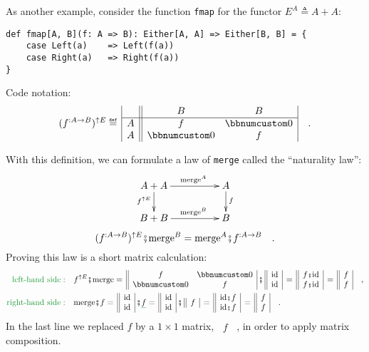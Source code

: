 As another example, consider the function \lstinline!fmap! for the
functor $E^{A}\triangleq A+A$:
\begin{lstlisting}
def fmap[A, B](f: A => B): Either[A, A] => Either[B, B] = {
    case Left(a)    => Left(f(a))
    case Right(a)   => Right(f(a))
}
\end{lstlisting}
Code notation:
\[
(f^{:A\rightarrow B})^{\uparrow E}\triangleq\,\begin{array}{|c||cc|}
 & B & B\\
\hline A & f & \bbnum 0\\
A & \bbnum 0 & f
\end{array}\quad.
\]

With this definition, we can formulate a law of \lstinline!merge!
called the \textsf{``}naturality law\textsf{''}:
\[
\xymatrix{\xyScaleY{1.6pc}\xyScaleX{4.0pc}A+A\ar[d]\sb(0.45){f^{\uparrow E}}\ar[r]\sp(0.55){\text{merge}^{A}} & A\ar[d]\sp(0.45){f}\\
B+B\ar[r]\sp(0.55){\text{merge}^{B}} & B
}
\]
\[
(f^{:A\rightarrow B})^{\uparrow E}\bef\text{merge}^{B}=\text{merge}^{A}\bef f^{:A\rightarrow B}\quad.
\]
Proving this law is a short matrix calculation:
\begin{align*}
{\color{greenunder}\text{left-hand side}:}\quad & f^{\uparrow E}\bef\text{merge}=\,\begin{array}{||cc|}
f & \bbnum 0\\
\bbnum 0 & f
\end{array}\,\bef\,\begin{array}{||c|}
\text{id}\\
\text{id}
\end{array}\,=\,\begin{array}{||c|}
f\bef\text{id}\\
f\bef\text{id}
\end{array}\,=\,\begin{array}{||c|}
f\\
f
\end{array}\quad,\\
{\color{greenunder}\text{right-hand side}:}\quad & \text{merge}\bef f=\,\begin{array}{||c|}
\text{id}\\
\text{id}
\end{array}\,\bef\gunderline f=\,\begin{array}{||c|}
\text{id}\\
\text{id}
\end{array}\,\bef\,\begin{array}{||c|}
f\end{array}\,=\,\begin{array}{||c|}
\text{id}\bef f\\
\text{id}\bef f
\end{array}\,=\,\begin{array}{||c|}
f\\
f
\end{array}\quad.
\end{align*}
In the last line we replaced $f$ by a $1\times1$ matrix, $\,\begin{array}{||c|}
f\end{array}$~, in order to apply matrix composition.


